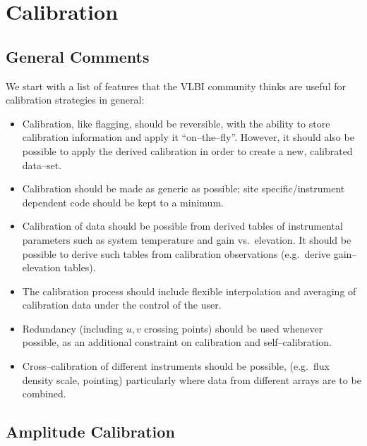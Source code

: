 \section{Calibration}

\subsection{General Comments}

We start with a list of features that the VLBI community thinks are 
useful for calibration strategies in general:

\begin{itemize}
  
\item Calibration, like flagging, should be reversible, with the
  ability to store calibration information and apply it
  ``on--the--fly''. However, it should also be possible to apply
  the derived calibration in order to create a new,
  calibrated data--set.
  
\item Calibration should be made as generic as possible; site
  specific\slash instru\-ment dependent code should be kept to a
  minimum.
  
\item Calibration of data should be possible from derived tables of
  instrumental parameters such as system temperature and gain vs.\
  elevation. It should be possible to derive such tables from
  calibration observations (e.g.\ derive gain--elevation tables).
  
\item The calibration process should include flexible interpolation
  and averaging of calibration data under the control of the user.
  
\item Redundancy (including $u,\! v$ crossing points) should be used
  whenever possible, as an additional constraint on calibration and
  self--calibration.
  
\item Cross--calibration of different instruments should be possible,
  (e.g.\  flux density scale, pointing) particularly where data from
  different arrays are to be combined.

\end{itemize}

\subsection{Amplitude Calibration}

